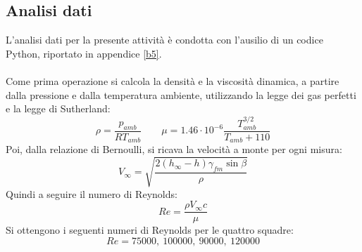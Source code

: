 \subsection{Analisi dati}
L'analisi dati per la presente attività è condotta con l'ausilio di un codice Python, riportato in appendice \ref{b5}.\\\\
Come prima operazione si calcola la densità e la viscosità dinamica, a partire dalla pressione e dalla temperatura ambiente, utilizzando la legge dei gas perfetti e la legge di Sutherland:
\begin{equation*}
    \rho = \frac{p_{amb}}{RT_{amb}} \qquad \mu = 1.46\cdot10^{-6} \frac{T_{amb}^{3/2}}{T_{amb}+110}
\end{equation*}
Poi, dalla relazione di Bernoulli, si ricava la velocità a monte per ogni misura:
\begin{equation*}
    V_\infty = \sqrt{\frac{2(h_{\infty}-h) \gamma_{fm} \sin \beta}{\rho}}
\end{equation*}
Quindi a seguire il numero di Reynolds:
\begin{equation*}
    Re = \frac{\rho V_\infty c}{\mu}
\end{equation*}
Si ottengono i seguenti numeri di Reynolds per le quattro squadre:
\begin{equation*}
    Re = 75000,\ 100000,\ 90000,\ 120000
\end{equation*}

